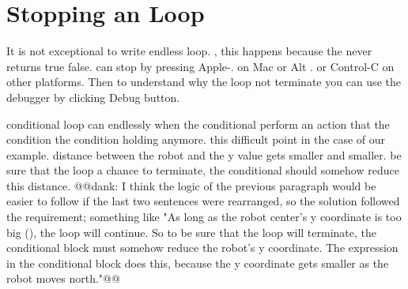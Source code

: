 {{{\section{Stopping an  Loop}
It is not exceptional to write  endless loop. , this happens because the  never returns true false. \add{\paragraph
} 
 can stop   by pressing  Apple-. on Mac or Alt . or Control-C on other platforms. Then to understand why the loop  not terminate\add{,} you can use the debugger  by clicking  Debug button.

 conditional loop can  endlessly  when the conditional  perform an action that  the condition the condition  holding anymore.  this difficult point in the case of our example.   distance between the robot and the  y value  gets smaller and smaller.  be sure that the loop  a chance to terminate,  the conditional  should somehow reduce this distance.  @@dank: I think the logic of the previous paragraph would be easier to follow if the last two sentences were rearranged, so the solution followed the requirement; something like "As long as the robot center's y coordinate is too big (), the loop will continue. So to be sure that the loop will terminate, the conditional block must somehow reduce the robot's y coordinate.  The expression  in the conditional block does this, because the y coordinate gets smaller as the robot moves north."@@    

}}}
